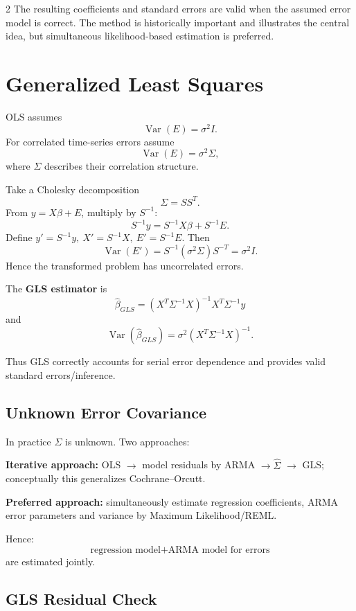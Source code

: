 \documentclass[9pt,a4paper]{extarticle}
\newcommand{\key}[1]{\textbf{#1}}
\begin{document}
\begin{multicols}{2}
The resulting coefficients and standard errors are valid when the assumed error model is correct. The method is historically important and illustrates the central idea, but simultaneous likelihood-based estimation is preferred.

\section{Generalized Least Squares}

OLS assumes
\[
\operatorname{Var}(E)=\sigma^2I.
\]
For correlated time-series errors assume
\[
\boxed{\operatorname{Var}(E)=\sigma^2\Sigma},
\]
where \(\Sigma\) describes their correlation structure.

Take a Cholesky decomposition
\[
\Sigma=SS^T.
\]
From \(y=X\beta+E\), multiply by \(S^{-1}\):
\[
S^{-1}y=S^{-1}X\beta+S^{-1}E.
\]
Define \(y'=S^{-1}y,\ X'=S^{-1}X,\ E'=S^{-1}E\). Then
\[
\operatorname{Var}(E')
=S^{-1}(\sigma^2\Sigma)S^{-T}
=\sigma^2I.
\]
Hence the transformed problem has uncorrelated errors.

The \key{GLS estimator} is
\[
\boxed{
\widehat\beta_{GLS}
=(X^T\Sigma^{-1}X)^{-1}
X^T\Sigma^{-1}y
}
\]
and
\[
\boxed{
\operatorname{Var}(\widehat\beta_{GLS})
=\sigma^2(X^T\Sigma^{-1}X)^{-1}.
}
\]

Thus GLS correctly accounts for serial error dependence and provides valid standard errors/inference.

\subsection{Unknown Error Covariance}

In practice \(\Sigma\) is unknown. Two approaches:

\key{Iterative approach:} OLS \(\to\) model residuals by ARMA \(\to\widehat\Sigma\) \(\to\) GLS; conceptually this generalizes Cochrane--Orcutt.

\key{Preferred approach:} simultaneously estimate regression coefficients, ARMA error parameters and variance by Maximum Likelihood/REML.

Hence:
\[
\boxed{
\text{regression model}
+
\text{ARMA model for errors}
}
\]
are estimated jointly.

\subsection{GLS Residual Check}


\end{multicols}
\end{document}

